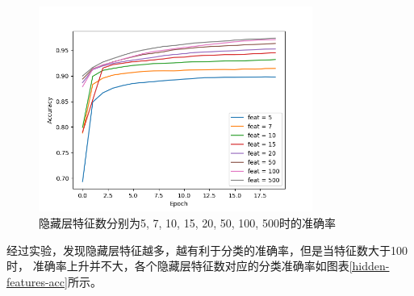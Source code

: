 \documentclass{article}
\begin{document}
\begin{figure}[H]
    \centering
    \includegraphics[width=0.8\textwidth]{figures/fig_02.png}
    \caption{隐藏层特征数分别为5, 7, 10, 15, 20, 50, 100, 500时的准确率}
    \label{hidden-features}
\end{figure}

经过实验，发现隐藏层特征越多，越有利于分类的准确率，但是当特征数大于100时，
准确率上升并不大，各个隐藏层特征数对应的分类准确率如图表\ref{hidden-features-acc}所示。
\end{document}
